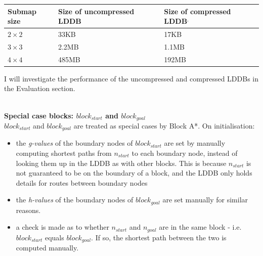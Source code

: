 \documentclass[12pt,notitlepage]{report}
\begin{document}
\begin{center}
    \begin{tabular}{| l | l | l |}
    \hline
    Submap size & Size of uncompressed LDDB & Size of compressed LDDB\footnotemark[3]$^{,}$\footnotemark[4]  \\ \hline
    {$2 \times 2$}  & 33KB  & 17KB \\ \hline
    {$3 \times 3$}  & 2.2MB & 1.1MB \\ \hline
    {$4 \times 4$}  & 485MB & 192MB \\ \hline
  \end{tabular}
\end{center}

\noindent
I will investigate the performance of the uncompressed and compressed LDDBs in the Evaluation section.\\
\\


\noindent
{\bf Special case blocks: $block_{start}$ and $block_{goal}$} \\

\noindent
$block_{start}$ and $block_{goal}$ are treated as special cases by Block A*. On initialisation:
\begin{itemize}
\item the {\em g-values} of the boundary nodes of $block_{start}$ are set by manually computing shortest paths from $n_{start}$ to each boundary node, instead of looking them up in the LDDB as with other blocks. This is because $n_{start}$ is not guaranteed to be on the boundary of a block, and the LDDB only holds details for routes between boundary nodes
\item the {\em h-values} of the boundary nodes of $block_{goal}$ are set manually for similar reasons.
\item a check is made as to whether $n_{start}$ and $n_{goal}$ are in the same block - i.e. $block_{start}$ equals $block_{goal}$. If so, the shortest path between the two is computed  manually.
\end{itemize}
\end{document}
